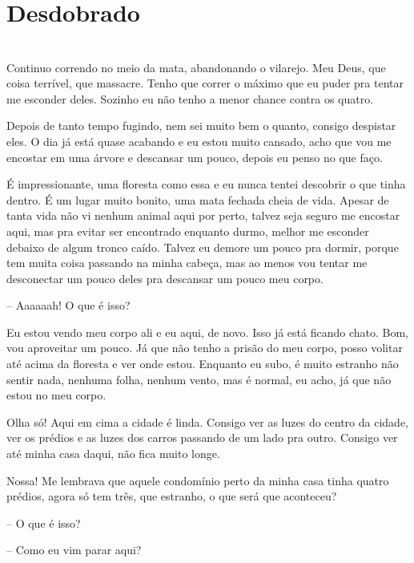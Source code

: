 
\newpage


\ifdefined\useChapters
\chapter{Desdobrado}
\else
\chapter{}
\fi

Continuo correndo no meio da mata, abandonando o vilarejo. Meu Deus, que coisa terrível, que massacre. Tenho que correr o máximo que eu puder pra tentar me esconder deles. Sozinho eu não tenho a menor chance contra os quatro.

Depois de tanto tempo fugindo, nem sei muito bem o quanto, consigo despistar eles. O dia já está quase acabando e eu estou muito cansado, acho que vou me encostar em uma árvore e descansar um pouco, depois eu penso no que faço.

É impressionante, uma floresta como essa e eu nunca tentei descobrir o que tinha dentro. É um lugar muito bonito, uma mata fechada cheia de vida. Apesar de tanta vida não vi nenhum animal aqui por perto, talvez seja seguro me encostar aqui, mas pra evitar ser encontrado enquanto durmo, melhor me esconder debaixo de algum tronco caído. Talvez eu demore um pouco pra dormir, porque tem muita coisa passando na minha cabeça, mas ao menos vou tentar me desconectar um pouco deles pra descansar um pouco meu corpo.

-- Aaaaaah! O que é isso?

Eu estou vendo meu corpo ali e eu aqui, de novo. Isso já está ficando chato. Bom, vou aproveitar um pouco.
Já que não tenho a prisão do meu corpo, posso volitar até acima da floresta e ver onde estou. Enquanto eu subo, é muito estranho não sentir nada, nenhuma folha, nenhum vento, mas é normal, eu acho, já que não estou no meu corpo.

Olha só! Aqui em cima a cidade é linda. Consigo ver as luzes do centro da cidade, ver os prédios e as luzes dos carros passando de um lado pra outro. Consigo ver até minha casa daqui, não fica muito longe.

Nossa! Me lembrava que aquele condomínio perto da minha casa tinha quatro prédios, agora só tem três, que estranho, o que será que aconteceu?

-- O que é isso?

-- Como eu vim parar aqui?

